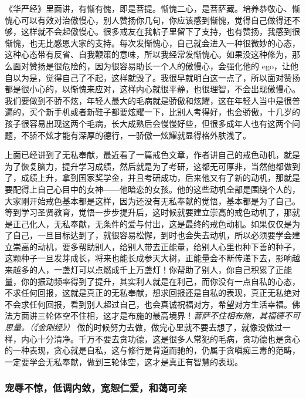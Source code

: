 《华严经》里面讲，有惭有愧，即是菩提。惭愧二心，是菩萨藏。培养恭敬心、惭愧心可以有效对治傲慢心，别人赞扬你几句，你应该感到惭愧，觉得自己做得还不够，这样就不会起傲慢心。很多戒友在我帖子里留下了支持，也有赞扬，我感到很惭愧，也无比感恩大家的支持。每次发惭愧心，自己就会进入一种很微妙的心态，这种心态带有反省、自我鞭策的意味，所以我经常发惭愧心。如果没这种修为，那么面对赞扬是很危险的，因为很容易助长一个人的傲慢心，会强化他的 ego，让他自以为是，觉得自己了不起，这样就毁了。我很早就明白这一点了，所以面对赞扬都是很小心的，以惭愧来应对，这样内心就很平静，也很理智，不会出现傲慢心。我们要做到不骄不炫，年轻人最大的毛病就是骄傲和炫耀，这在年轻人当中是很普遍的，买个新手机或者新鞋子都要炫耀一下，比别人考得好，也会骄傲，十几岁的孩子很容易出现这两个毛病，长大成熟后会慢慢好些，但很多成年人也有这两个问题，不骄不炫才能有深厚的德行，一骄傲一炫耀就显得格外肤浅了。

上面已经讲到了无私奉献，最近看了一篇戒色文章，作者讲自己的戒色动机，就是为了恢复脑力，提升学习成绩，然后就是为了考研，这都无可厚非，当然他都做到了，成绩上升，拿到国家奖学金，并且考研成功，后来他又有了新的动机，那就是要配得上自己心目中的女神——他暗恋的女孩。他的这些动机全部是围绕个人的，大家刚开始戒色基本都是这样，因为还没有无私奉献的觉悟，基本都是为了自己。等到学习圣贤教育，觉悟一步步提升后，这时候就要建立崇高的戒色动机了，那就是正己化人，无私奉献，无条件的爱与付出，这是最终的戒色动机。如果仅仅是为了自己，一旦目标达到了，就很容易松懈，到时也会失去动机，所以必须要学会建立崇高的动机，要多帮助别人，给别人带去正能量，给别人心里也种下善的种子，这颗种子一旦发芽成长，将来也能长成参天大树，正能量会不断传递下去，影响越来越多的人，一盏灯可以点燃成千上万盏灯！你帮助了别人，你自己积累了正能量，你的振动频率得到了提升，其实利人就是在利己，而你没有一点自私的心态，不求任何回报，这就是真正的无私奉献，想求回报还是自私的表现，真正无私绝对不会求任何回报，看到别人超过自己，也会真诚祝福对方，希望对方生活幸福。佛法方面讲三轮体空不住相，这才是布施的最高境界！\textit{菩萨不住相布施，其福德不可思量。（《金刚经》）} 做的时候努力去做，做完心里就不要去想了，就像没做过一样，内心十分清净。千万不要去贪功德，这是很多人常犯的毛病，贪功德也是贪心的一种表现，贪心就是自私，这与修行是背道而驰的，仍属于贪嗔痴三毒的范畴，一定要学会无私奉献，做到三轮体空，这才是真正有智慧的表现。

\subsubsection{宠辱不惊，低调内敛，宽恕仁爱，和蔼可亲}

